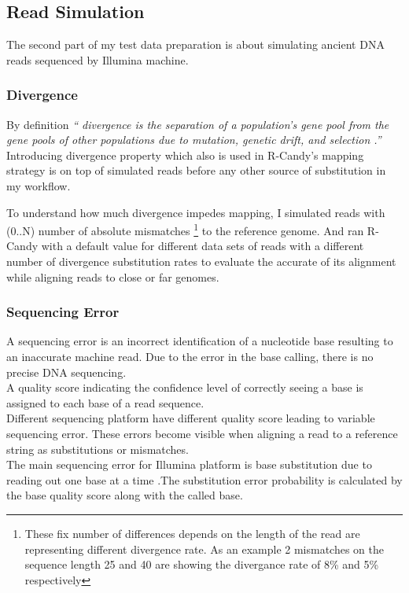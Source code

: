 \documentclass[11pt,a4paper]{report}
\newcommand{\quotes}[1]{``#1''}
\begin{document}

\subsection{Read Simulation} \label{Read Simulation}

The second part of my test data preparation is about simulating ancient DNA reads 
sequenced by Illumina machine.




\subsubsection{Divergence} \label{Divergence}

By definition \emph{\quotes{ divergence is the separation
of a population's gene pool from the gene pools of other populations 
due to mutation, genetic drift, and selection \cite{divergence1}.}}\\

Introducing divergence property which also is used in R-Candy's mapping strategy 
is on top of simulated reads before any other source of substitution in my workflow. 

To understand how much divergence impedes mapping, I simulated reads with (0..N) 
number of absolute mismatches \footnote {These fix number of differences depends 
on the length of the read are representing different divergence rate. As an example 
2 mismatches on the sequence length 25 and 40 are showing the divergance rate of 8\% 
and 5\% respectively} to the reference genome.
And ran R-Candy with a default value for different data sets of reads with a 
different number of divergence substitution rates to evaluate the accurate of its 
alignment while aligning reads to close or far genomes.
 
 

\subsubsection{Sequencing Error} \label{Sequencing Error}
 

A sequencing error is an incorrect identification of a nucleotide base resulting 
to an inaccurate machine read. Due to the error in the base calling, there is no 
precise DNA sequencing. \\
A quality score indicating the confidence level of correctly seeing a base is 
assigned to each base of a read sequence.\\
Different sequencing platform have different quality score leading to variable 
sequencing error. These errors become visible when aligning a read to a reference 
string as substitutions or mismatches.\\
The main sequencing error for Illumina platform is base substitution due to 
reading out one base at a time \cite{art}.The substitution error probability is 
calculated by the base quality score along with the called base.\\
\end{document}
